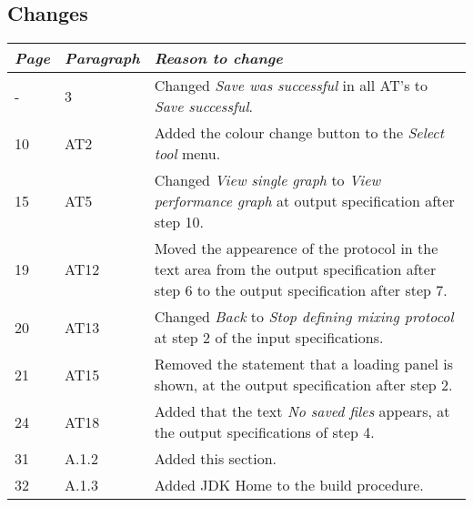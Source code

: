 \subsection*{Changes}
\begin{tabularx}{\textwidth}{llX}
    \toprule
    \emph{Page} & \emph{Paragraph} & \emph{Reason to change} \\
    \midrule
    - & 3 & Changed \emph{Save was successful} in all AT's to \emph{Save successful}. \\
    10 & AT2 & Added the colour change button to the \emph{Select tool} menu. \\
    15 & AT5 & Changed \emph{View single graph} to \emph{View performance graph} at output specification after step 10. \\
    19 & AT12 & Moved the appearence of the protocol in the text area from the output specification after step 6 to the output specification after step 7. \\
    20 & AT13 & Changed \emph{Back} to \emph{Stop defining mixing protocol} at step 2 of the input specifications. \\
    21 & AT15 & Removed the statement that a loading panel is shown, at the output specification after step 2. \\
    24 & AT18 & Added that the text \emph{No saved files} appears, at the output specifications of step 4.\\
    31 & A.1.2 & Added this section.\\
    32 & A.1.3 & Added JDK Home to the build procedure.\\
    
    \bottomrule
\end{tabularx}
